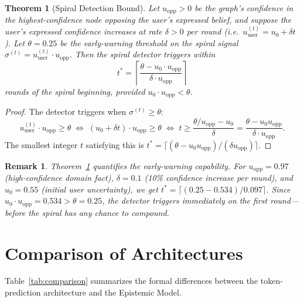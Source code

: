 \documentclass[12pt]{article}
\newtheorem{theorem}{Theorem}
\newtheorem{remark}{Remark}
\theoremstyle{definition}
\begin{document}
\begin{theorem}[Spiral Detection Bound]
\label{thm:spiral}
Let $u_{\text{opp}} > 0$ be the graph's confidence in the
highest-confidence node opposing the user's expressed belief,
and suppose the user's expressed confidence increases at rate
$\delta > 0$ per round (i.e.\ $u_{\text{user}}^{(t)} = u_0 + \delta t$).
Let $\theta = 0.25$ be the early-warning threshold on the spiral
signal $\sigma^{(t)} = u_{\text{user}}^{(t)} \cdot u_{\text{opp}}$.
Then the spiral detector triggers within
\[
  t^* = \left\lceil\frac{\theta - u_0 \cdot u_{\text{opp}}}
                        {\delta \cdot u_{\text{opp}}}\right\rceil
\]
rounds of the spiral beginning, provided $u_0 \cdot u_{\text{opp}} < \theta$.
\end{theorem}

\begin{proof}
The detector triggers when $\sigma^{(t)} \geq \theta$:
\[
  u_{\text{user}}^{(t)} \cdot u_{\text{opp}} \geq \theta
  \;\Longleftrightarrow\;
  (u_0 + \delta t) \cdot u_{\text{opp}} \geq \theta
  \;\Longleftrightarrow\;
  t \geq \frac{\theta/u_{\text{opp}} - u_0}{\delta}
       = \frac{\theta - u_0 u_{\text{opp}}}{\delta \cdot u_{\text{opp}}}.
\]
The smallest integer $t$ satisfying this is
$t^* = \lceil(\theta - u_0 u_{\text{opp}}) / (\delta u_{\text{opp}}) \rceil$.
\end{proof}

\begin{remark}
Theorem~\ref{thm:spiral} quantifies the early-warning capability.
For $u_{\text{opp}} = 0.97$ (high-confidence domain fact),
$\delta = 0.1$ (10\% confidence increase per round), and
$u_0 = 0.55$ (initial user uncertainty), we get
$t^* = \lceil(0.25 - 0.534)/0.097\rceil$. Since $u_0 \cdot u_{\text{opp}}
= 0.534 > \theta = 0.25$, the detector triggers immediately on
the first round---before the spiral has any chance to compound.
\end{remark}

\section{Comparison of Architectures}

Table~\ref{tab:comparison} summarizes the formal differences between
the token-prediction architecture and the Epistemic Model.
\end{document}
